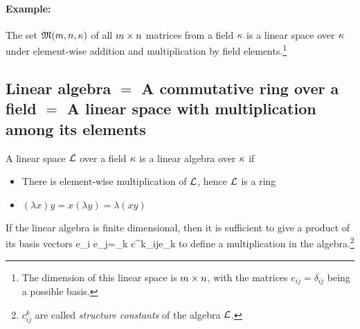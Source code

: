 \paragraph{Example:} The set $\mathfrak{M}(m,n,\kappa)$ of all $m\times n$ matrices from a field $\kappa$ is a linear space over $\kappa$ under element-wise addition and multiplication by field elements.\footnote{The dimension of this linear space is $m\times n$, with the matrices $e_{ij}=\delta_{ij}$ being a possible basis.}
\subsection{Linear algebra $=$ A commutative ring over a field $=$ A linear space with multiplication among its elements}
A linear space $\mathcal{L}$ over a field $\kappa$ is a linear algebra over $\kappa$ if
\begin{itemize}
	\item There is element-wise multiplication of $\mathcal{L}$, hence $\mathcal{L}$ is a ring
	\item $(\lambda x)y=x(\lambda y)=\lambda (xy)$
\end{itemize}
If the linear algebra is finite dimensional, then it is sufficient to give a product of its basis vectors
\be 
e_i e_j=\sum\limits_k c^k_{ij}e_k
\ee 
to define a multiplication in the algebra.\footnote{
$c^k_{ij}$ are called \emph{structure constants} of the algebra $\mathcal{L}$.
}
